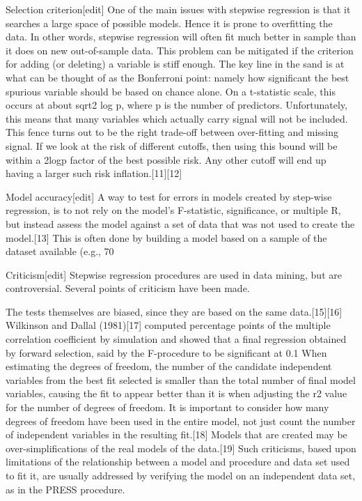 Selection criterion[edit]
One of the main issues with stepwise regression is that it searches a large space of possible models. Hence it is prone to overfitting the data. In other words, stepwise regression will often fit much better in sample than it does on new out-of-sample data. This problem can be mitigated if the criterion for adding (or deleting) a variable is stiff enough. The key line in the sand is at what can be thought of as the Bonferroni point: namely how significant the best spurious variable should be based on chance alone. On a t-statistic scale, this occurs at about sqrt{2 log p}, where p is the number of predictors. Unfortunately, this means that many variables which actually carry signal will not be included. This fence turns out to be the right trade-off between over-fitting and missing signal. If we look at the risk of different cutoffs, then using this bound will be within a 2logp factor of the best possible risk. Any other cutoff will end up having a larger such risk inflation.[11][12]

Model accuracy[edit]
A way to test for errors in models created by step-wise regression, is to not rely on the model's F-statistic, significance, or multiple R, but instead assess the model against a set of data that was not used to create the model.[13] This is often done by building a model based on a sample of the dataset available (e.g., 70%

Criticism[edit]
Stepwise regression procedures are used in data mining, but are controversial. Several points of criticism have been made.

The tests themselves are biased, since they are based on the same data.[15][16] Wilkinson and Dallal (1981)[17] computed percentage points of the multiple correlation coefficient by simulation and showed that a final regression obtained by forward selection, said by the F-procedure to be significant at 0.1%
When estimating the degrees of freedom, the number of the candidate independent variables from the best fit selected is smaller than the total number of final model variables, causing the fit to appear better than it is when adjusting the r2 value for the number of degrees of freedom. It is important to consider how many degrees of freedom have been used in the entire model, not just count the number of independent variables in the resulting fit.[18]
Models that are created may be over-simplifications of the real models of the data.[19]
Such criticisms, based upon limitations of the relationship between a model and procedure and data set used to fit it, are usually addressed by verifying the model on an independent data set, as in the PRESS procedure.

